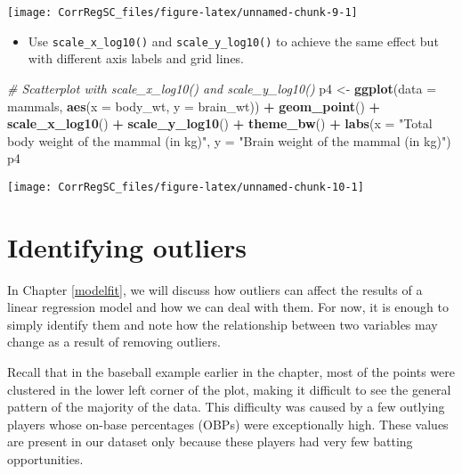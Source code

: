 \documentclass[
]{book}
\newenvironment{Shaded}{\begin{snugshade}}{\end{snugshade}}
\newcommand{\CommentTok}[1]{\textcolor[rgb]{0.56,0.35,0.01}{\textit{#1}}}
\newcommand{\DataTypeTok}[1]{\textcolor[rgb]{0.13,0.29,0.53}{#1}}
\newcommand{\KeywordTok}[1]{\textcolor[rgb]{0.13,0.29,0.53}{\textbf{#1}}}
\newcommand{\NormalTok}[1]{#1}
\newcommand{\OperatorTok}[1]{\textcolor[rgb]{0.81,0.36,0.00}{\textbf{#1}}}
\newcommand{\StringTok}[1]{\textcolor[rgb]{0.31,0.60,0.02}{#1}}
\providecommand{\tightlist}{%
  \setlength{\itemsep}{0pt}\setlength{\parskip}{0pt}}
\begin{document}
\begin{center}\texttt{[image: CorrRegSC\_files/figure-latex/unnamed-chunk-9-1]} \end{center}

\begin{itemize}
\tightlist
\item
  Use \texttt{scale\_x\_log10()} and \texttt{scale\_y\_log10()} to achieve the same effect but with different axis labels and grid lines.
\end{itemize}

\begin{Shaded}
\begin{Highlighting}[]
\CommentTok{# Scatterplot with scale_x_log10() and scale_y_log10()}
\NormalTok{p4 <-}\StringTok{ }\KeywordTok{ggplot}\NormalTok{(}\DataTypeTok{data =}\NormalTok{ mammals, }\KeywordTok{aes}\NormalTok{(}\DataTypeTok{x =}\NormalTok{ body_wt, }\DataTypeTok{y =}\NormalTok{ brain_wt)) }\OperatorTok{+}
\StringTok{  }\KeywordTok{geom_point}\NormalTok{() }\OperatorTok{+}
\StringTok{  }\KeywordTok{scale_x_log10}\NormalTok{() }\OperatorTok{+}\StringTok{ }
\StringTok{  }\KeywordTok{scale_y_log10}\NormalTok{() }\OperatorTok{+}\StringTok{ }
\StringTok{  }\KeywordTok{theme_bw}\NormalTok{() }\OperatorTok{+}\StringTok{ }
\StringTok{  }\KeywordTok{labs}\NormalTok{(}\DataTypeTok{x =} \StringTok{"Total body weight of the mammal (in kg)"}\NormalTok{,}
       \DataTypeTok{y =} \StringTok{"Brain weight of the mammal (in kg)"}\NormalTok{)}
\NormalTok{p4}
\end{Highlighting}
\end{Shaded}

\begin{center}\texttt{[image: CorrRegSC\_files/figure-latex/unnamed-chunk-10-1]} \end{center}

\hypertarget{identifying-outliers}{%
\section{Identifying outliers}\label{identifying-outliers}}

In Chapter \ref{modelfit}, we will discuss how outliers can affect the results of a linear regression model and how we can deal with them. For now, it is enough to simply identify them and note how the relationship between two variables may change as a result of removing outliers.

Recall that in the baseball example earlier in the chapter, most of the points were clustered in the lower left corner of the plot, making it difficult to see the general pattern of the majority of the data. This difficulty was caused by a few outlying players whose on-base percentages (OBPs) were exceptionally high. These values are present in our dataset only because these players had very few batting opportunities.
\end{document}
